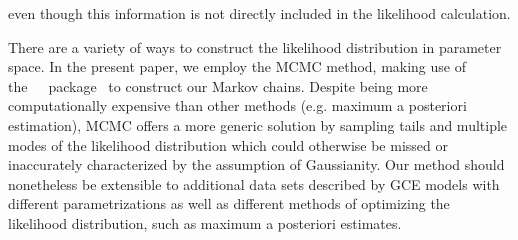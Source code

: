 \documentclass[ms.tex]{subfiles}
\begin{document}
even though this information is not directly included in the likelihood
calculation.
\par
There are a variety of ways to construct the likelihood distribution in
parameter space.
In the present paper, we employ the MCMC method, making use of
the~\mc~\python~package~\citep{Foreman-Mackey2013} to construct our Markov
chains.
Despite being more computationally expensive than other methods (e.g.
maximum a posteriori estimation), MCMC offers a more generic solution by
sampling tails and multiple modes of the likelihood distribution which could
otherwise be missed or inaccurately characterized by the assumption of
Gaussianity.
Our method should nonetheless be extensible to additional data sets described
by GCE models with different parametrizations as well as different methods of
optimizing the likelihood distribution, such as maximum a posteriori estimates.
\end{document}
